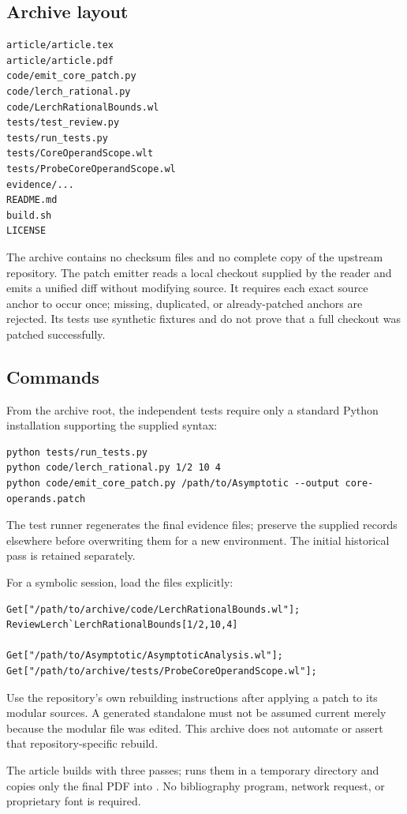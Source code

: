 \documentclass[11pt,a4paper]{article}
\theoremstyle{remark}\newtheorem{remark}[theorem]{Remark}
\newcommand{\code}[1]{\texttt{\detokenize{#1}}}
\begin{document}
\subsection{Archive layout}
\begin{lstlisting}
article/article.tex
article/article.pdf
code/emit_core_patch.py
code/lerch_rational.py
code/LerchRationalBounds.wl
tests/test_review.py
tests/run_tests.py
tests/CoreOperandScope.wlt
tests/ProbeCoreOperandScope.wl
evidence/...
README.md
build.sh
LICENSE
\end{lstlisting}
The archive contains no checksum files and no complete copy of the upstream
repository. The patch emitter reads a local checkout supplied by the reader and
emits a unified diff without modifying source. It requires each exact source
anchor to occur once; missing, duplicated, or already-patched anchors are
rejected. Its tests use synthetic fixtures and do not prove that a full checkout
was patched successfully.

\subsection{Commands}

From the archive root, the independent tests require only a standard Python
installation supporting the supplied syntax:
\begin{lstlisting}
python tests/run_tests.py
python code/lerch_rational.py 1/2 10 4
python code/emit_core_patch.py /path/to/Asymptotic --output core-operands.patch
\end{lstlisting}
The test runner regenerates the final evidence files; preserve the supplied
records elsewhere before overwriting them for a new environment. The initial
historical pass is retained separately.

For a symbolic session, load the files explicitly:
\begin{lstlisting}
Get["/path/to/archive/code/LerchRationalBounds.wl"];
ReviewLerch`LerchRationalBounds[1/2,10,4]

Get["/path/to/Asymptotic/AsymptoticAnalysis.wl"];
Get["/path/to/archive/tests/ProbeCoreOperandScope.wl"];
\end{lstlisting}
Use the repository's own rebuilding instructions after applying a patch to its
modular sources. A generated standalone must not be assumed current merely
because the modular file was edited. This archive does not automate or assert
that repository-specific rebuild.

The article builds with three \code{pdflatex} passes; \code{build.sh} runs them in
a temporary directory and copies only the final PDF into \code{article/}.
No bibliography program, network request, or proprietary font is required.
\end{document}
